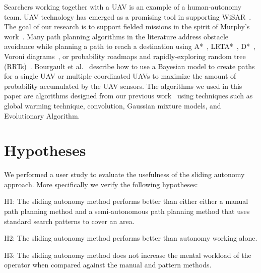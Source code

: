 \documentclass[lettersize, apacite, twoside, HRI]{apa_HRI}
\begin{document}
Searchers working together with a UAV is an example of a human-autonomy team. UAV technology has emerged as a promising tool in supporting WiSAR~\cite{Murphy2008Cooperative,Bourgault2003Coordinated}. The goal of our research is to support fielded missions in the spirit of Murphy's work~\cite{Casper2003Human}. Many path planning algorithms in the literature address obstacle avoidance while planning a path to reach a destination using A*~\cite{Quigley2005Towards}, LRTA*~\cite{Howlett2006Learning}, D*~\cite{Stentz1997Optimal}, Voroni diagrams~\cite{Bortoff2000Path,Beard2005Autonomous}, or probability roadmaps and rapidly-exploring random tree (RRTs)~\cite{Pettersson2006Probabilistic}. 
Bourgault et al.\ \cite{Bourgault2004Coordinated,Bourgault2006Optimal} describe how to use a Bayesian model to create paths for a single UAV or multiple coordinated UAVs to maximize the amount of probability accumulated by the UAV sensors. The algorithms we used in this paper are algorithms designed from our previous work~\cite{Lin2009UAV,Lin2014Hierarchical} using techniques such as global warming technique, convolution, Gaussian mixture models, and Evolutionary Algorithm.

\section{Hypotheses} 
\label{sec:Hypotheses}

We performed a user study to evaluate the usefulness of the sliding autonomy approach. More specifically we verify the following hypotheses:

H1: The sliding autonomy method performs better than either either a manual path planning method and a semi-autonomous path planning method that uses standard search patterns to cover an area.

H2: The sliding autonomy method performs better than autonomy working alone.

H3: The sliding autonomy method does not increase the mental workload of the operator when compared against the manual and pattern methods.

\end{document}
